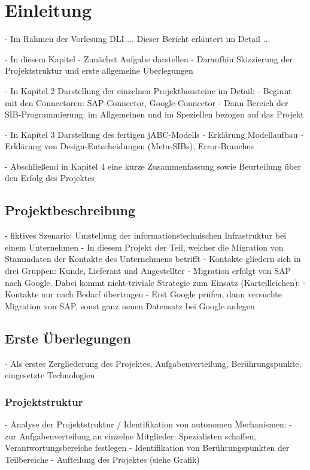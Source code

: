 \section{Einleitung}

- Im Rahmen der Vorlesung DLI ... Dieser Bericht erläutert im Detail ...

- In diesem Kapitel
	- Zunächst Aufgabe darstellen
	- Daraufhin Skizzierung der Projektstruktur und erste allgemeine Überlegungen

- In Kapitel 2 Darstellung der einzelnen Projektbausteine im Detail: 
	- Beginnt mit den Connectoren: SAP-Connector, Google-Connector
	- Dann Bereich der SIB-Programmierung: im Allgemeinen und im Speziellen bezogen auf das Projekt
	
- In Kapitel 3 Darstellung des fertigen jABC-Modells
	- Erklärung Modellaufbau
	- Erklärung von Design-Entscheidungen (Meta-SIBs), Error-Branches
	
- Abschließend in Kapitel 4 eine kurze Zusammenfassung sowie Beurteilung über den Erfolg des Projektes	


\subsection{Projektbeschreibung}
- fiktives Szenario: Umstellung der informationstechnischen Infrastruktur bei einem Unternehmen
	- In diesem Projekt der Teil, welcher die Migration von Stammdaten der Kontakte des Unternehmens betrifft
		- Kontakte gliedern sich in drei Gruppen: Kunde, Lieferant und Angestellter
	- Migration erfolgt von SAP nach Google. Dabei kommt nicht-triviale Strategie zum Einsatz (Karteilleichen):
		- Kontakte nur nach Bedarf übertragen
		- Erst Google prüfen, dann versuchte Migration von SAP, sonst ganz neuen Datensatz bei Google anlegen

\subsection{Erste Überlegungen}
- Als erstes Zergliederung des Projektes, Aufgabenverteilung, Berührungspunkte, eingesetzte Technologien

\subsubsection{Projektstruktur}
- Analyse der Projektstruktur / Identifikation von autonomen Mechanismen:
	- zur Aufgabenverteilung an einzelne Mitglieder: Spezialisten schaffen, Verantwortungsbereiche festlegen
	- Identifikation von Berührungspunkten der Teilbereiche
	- Aufteilung des Projektes (siehe Grafik)
	
